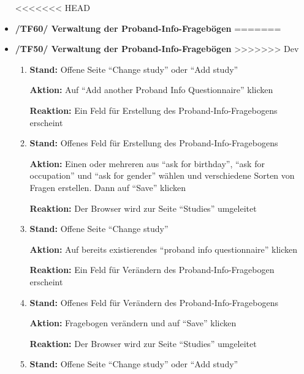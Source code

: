 \documentclass[a4paper]{scrreprt}
\begin{document}
\begin{itemize}
<<<<<<< HEAD
		                      \item \textbf{/TF60/ Verwaltung der Proband-Info-Frageb\"ogen}
=======
		                      \item \textbf{/TF50/ Verwaltung der Proband-Info-Frageb\"ogen}
>>>>>>> Dev
		                          \begin{enumerate}
		                              \item \par \textbf{Stand: }Offene Seite ``Change study'' oder ``Add study''
		                                    \par \textbf{Aktion: }Auf ``Add another Proband Info Questionnaire'' klicken
		                                    \par \textbf{Reaktion: }Ein Feld f\"ur Erstellung des Proband-Info-Fragebogens erscheint
		                              \item \par \textbf{Stand: }Offenes Feld f\"ur Erstellung des Proband-Info-Fragebogens
		                                    \par \textbf{Aktion: }Einen oder mehreren aus ``ask for birthday'', ``ask for occupation'' und ``ask for gender'' w\"ahlen und verschiedene Sorten von Fragen erstellen. Dann auf ``Save'' klicken
		                                    \par \textbf{Reaktion: }Der Browser wird zur Seite ``Studies'' umgeleitet
		                              \item \par \textbf{Stand: }Offene Seite ``Change study''
		                                    \par \textbf{Aktion: }Auf bereits existierendes ``proband info questionnaire'' klicken
		                                    \par \textbf{Reaktion: }Ein Feld f\"ur Ver\"andern des Proband-Info-Fragebogen erscheint
		                              \item \par \textbf{Stand: }Offenes Feld f\"ur Ver\"andern des Proband-Info-Fragebogens
		                                    \par \textbf{Aktion: }Fragebogen ver\"andern und auf ``Save'' klicken
		                                    \par \textbf{Reaktion: }Der Browser wird zur Seite ``Studies'' umgeleitet
		                              \item \par \textbf{Stand: }Offene Seite ``Change study'' oder ``Add study''

\end{enumerate}
\end{itemize}
\end{document}
